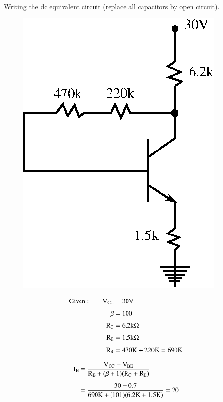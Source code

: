 \begin{solution}
Writing the dc equivalent circuit (replace all capacitors by open circuit).

\noindent
\begin{minipage}[c]{7cm}
\begin{figure}[H]
\centering
\includegraphics[scale=.9]{chap3/fig3.19.eps}
\end{figure}
\end{minipage}
\quad
\begin{minipage}[c]{7cm}
\begin{align*}
\text{Given~:}\qquad \textrm{V}_{\text{CC}} &= 30\textrm{V}\\[3pt]
\beta &= 100\\[3pt]
\textrm{R}_{\textrm{C}} &= 6.2\textrm{k}\Omega\\[3pt]
\textrm{R}_{\textrm{E}} &= 1.5\textrm{k}\Omega\\[3pt]
\textrm{R}_{\textrm{B}} &= 470\textrm{K}+220\textrm{K}=690\textrm{K}
\end{align*}
\end{minipage}
\begin{align*}
\rmI_{\rmB} &= \frac{\rmV_{\text{CC}}-\rmV_{\text{BE}}}{\rmR_{\rmB}+(\beta+1)(\rmR_{\rmC}+\rmR_{\rmE})}\\[5pt]
&=\dfrac{30-0.7}{690\rmK+(101)(6.2\rmK+1.5\rmK)}=20\\[5pt]

\end{align*}
\end{solution}

